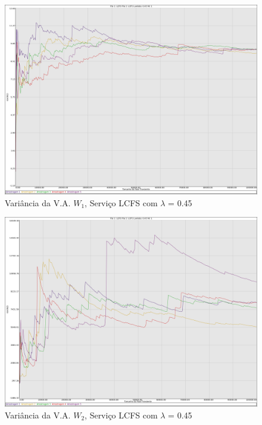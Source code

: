\documentclass[a4paper,10pt]{article}
\begin{document}
\begin{figure}
	\caption{Variância da V.A. $W_1$, Serviço LCFS com $\lambda$ = 0.45}
	\label{figTransienteLCFSfila1VarW}
	\includegraphics[scale = 0.20]{./graficos_transiente_1/LCFS/09.png}
\end{figure}

\begin{figure}
	\caption{Variância da V.A. $W_2$, Serviço LCFS com $\lambda$ = 0.45}
	\label{figTransienteLCFSfila2VarW}
	\includegraphics[scale = 0.20]{./graficos_transiente_1/LCFS/10.png}
\end{figure}

\clearpage
\end{document}
